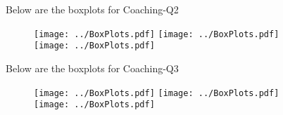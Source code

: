 \documentclass[11pt]{extarticle} %
\begin{document}
\newpage
Below are the boxplots for Coaching-Q2
\begin{figure}[H]
\centering 
\texttt{[image: ../BoxPlots.pdf]} 
\texttt{[image: ../BoxPlots.pdf]} \\
\texttt{[image: ../BoxPlots.pdf]} \\
\end{figure}

\newpage
Below are the boxplots for Coaching-Q3
\begin{figure}[H]
\centering 
\texttt{[image: ../BoxPlots.pdf]} 
\texttt{[image: ../BoxPlots.pdf]} \\
\texttt{[image: ../BoxPlots.pdf]} \\
\end{figure}
\end{document}
